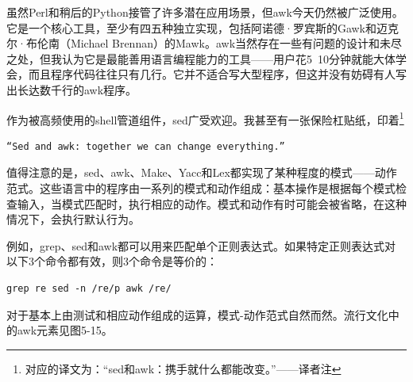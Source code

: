 \documentclass[a4paper,12pt,UTF8,twoside]{ctexbook}
\begin{document}
虽然Perl和稍后的Python接管了许多潜在应用场景，但awk今天仍然被广泛使用。它是一个核心工具，至少有四五种独立实现，包括阿诺德·罗宾斯的Gawk和迈克尔·布伦南（Michael Brennan）的Mawk。awk当然存在一些有问题的设计和未尽之处，但我认为它是最能善用语言编程能力的工具——用户花5~10分钟就能大体学会，而且程序代码往往只有几行。它并不适合写大型程序，但这并没有妨碍有人写出长达数千行的awk程序。

作为被高频使用的shell管道组件，sed广受欢迎。我甚至有一张保险杠贴纸，印着\footnote{对应的译文为：“sed和awk：携手就什么都能改变。”——译者注}

\begin{lstlisting}
“Sed and awk: together we can change everything.”
\end{lstlisting}

值得注意的是，sed、awk、Make、Yacc和Lex都实现了某种程度的模式——动作范式。这些语言中的程序由一系列的模式和动作组成：基本操作是根据每个模式检查输入，当模式匹配时，执行相应的动作。模式和动作有时可能会被省略，在这种情况下，会执行默认行为。

例如，grep、sed和awk都可以用来匹配单个正则表达式。如果特定正则表达式对以下3个命令都有效，则3个命令是等价的：

\begin{lstlisting}
grep re sed -n /re/p awk /re/
\end{lstlisting}

对于基本上由测试和相应动作组成的运算，模式-动作范式自然而然。流行文化中的awk元素见图5-15。
\end{document}
